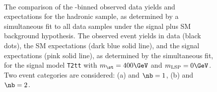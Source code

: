 \begin{figure}[t!]
  \begin{center}
     \\
    \caption{\label{fig:t2cc-best-fit}The comparison of
      the \scalht-binned observed data yields and expectations for the
      hadronic sample, as determined by a simultaneous fit to all data
      samples under the signal plus SM background hypothesis. The
      observed event yields in data (black dots), the SM expectations
      (dark blue solid line), and the signal expectations (pink solid
      line), as determined by the simultaneous fit, for the 
      signal model \texttt{T2tt} with $m_{\st} = 400\GeV$ and
      $m_{\text{LSP}} = 0\GeV$. Two event categories are
      considered: (a) \njethigh and $\nb = 1$, (b) \njethigh and
      $\nb = 2$.}
  \end{center}
\end{figure}
